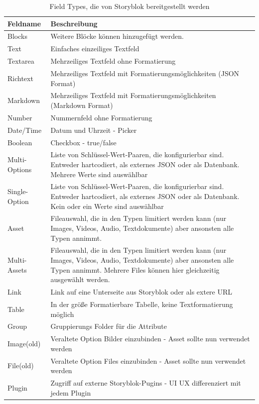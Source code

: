 \begin{longtable}[c]{|l|p{10cm}|}
    \caption{Field Types, die von Storyblok bereitgestellt werden}
    \label{tab:beispiel} \\
    \hline
    \textbf{Feldname} & \textbf{Beschreibung} \\
    \hline
    \endhead
    \hline
    \endfoot
    Blocks & Weitere Blöcke können hinzugefügt werden. \\
    \hline
    Text & Einfaches einzeiliges Textfeld \\
    \hline
    Textarea & Mehrzeiliges Textfeld ohne Formatierung \\
    \hline
    Richtext & Mehrzeiliges Textfeld mit Formatierungsmöglichkeiten (JSON Format) \\
    \hline
    Markdown & Mehrzeiliges Textfeld mit Formatierungsmöglichkeiten (Markdown Format) \\
    \hline
    Number & Nummernfeld ohne Formatierung \\
    \hline
    Date/Time & Datum und Uhrzeit - Picker \\
    \hline
    Boolean & Checkbox - true/false \\
    \hline
    Multi-Options & Liste von Schlüssel-Wert-Paaren, die konfigurierbar sind. Entweder hartcodiert, als externes JSON oder als Datenbank. Mehrere Werte sind auswählbar \\
    \hline
    Single-Option & Liste von Schlüssel-Wert-Paaren, die konfigurierbar sind. Entweder hartcodiert, als externes JSON oder als Datenbank. Kein oder ein Werte sind auswählbar \\
    \hline
    Asset & Fileauswahl, die in den Typen limitiert werden kann (nur Images, Videos, Audio, Textdokumente) aber ansonsten alle Typen annimmt. \\
    \hline
    Multi-Assets & Fileauswahl, die in den Typen limitiert werden kann (nur Images, Videos, Audio, Textdokumente) aber ansonsten alle Typen annimmt. Mehrere Files können hier gleichzeitig ausgewählt werden. \\
    \hline
    Link & Link auf eine Unterseite aus Storyblok oder als extere URL \\
    \hline
    Table & In der größe Formatierbare Tabelle, keine Textformatierung möglich \\
    \hline
    Group & Gruppierungs Folder für die Attribute\\
    \hline
    Image(old) & Veraltete Option Bilder einzubinden - Asset sollte nun verwendet werden \\
    \hline
    File(old) & Veraltete Option Files einzubinden - Asset sollte nun verwendet werden \\
    \hline
    Plugin & Zugriff auf externe Storyblok-Pugins - UI UX differenziert mit jedem Plugin \\
    \hline
\end{longtable}

